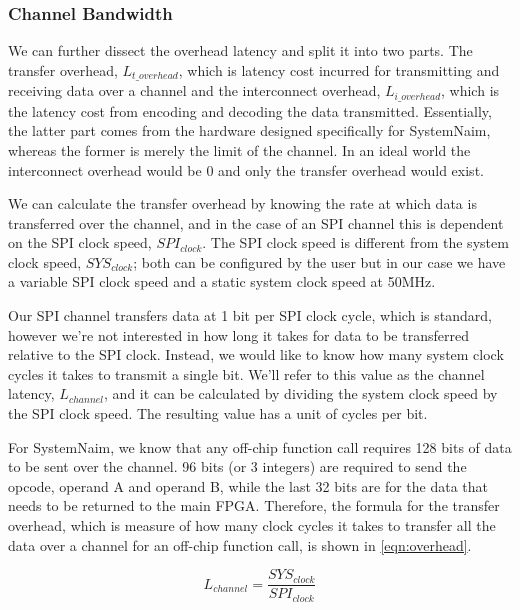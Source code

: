 \subsubsection{Channel Bandwidth}
 
We can further dissect the overhead latency and split it into two parts. The transfer overhead, $L_{t\_overhead}$, which is latency cost incurred for transmitting and receiving data over a channel and the interconnect overhead, $L_{i\_overhead}$, which is the latency cost from encoding and decoding the data transmitted. Essentially, the latter part comes from the hardware designed specifically for SystemNaim, whereas the former is merely the limit of the channel. In an ideal world the interconnect overhead would be 0 and only the transfer overhead would exist. 

We can calculate the transfer overhead by knowing the rate at which data is transferred over the channel, and in the case of an SPI channel this is dependent on the SPI clock speed, $\mathit{SPI}_{clock}$. The SPI clock speed is different from the system clock speed, $\mathit{SYS}_{clock}$; both can be configured by the user but in our case we have a variable SPI clock speed and a static system clock speed at 50MHz.

Our SPI channel transfers data at 1 bit per SPI clock cycle, which is standard, however we're not interested in how long it takes for data to be transferred relative to the SPI clock. Instead, we would like to know how many system clock cycles it takes to transmit a single bit. We'll refer to this value as the channel latency, $L_{channel}$, and it can be calculated by dividing the system clock speed by the SPI clock speed. The resulting value has a unit of cycles per bit.

For SystemNaim, we know that any off-chip function call requires 128 bits of data to be sent over the channel. 96 bits (or 3 integers) are required to send the opcode, operand A and operand B, while the last 32 bits are for the data that needs to be returned to the main FPGA. Therefore, the formula for the transfer overhead, which is measure of how many clock cycles it takes to transfer all the data over a channel for an off-chip function call, is shown in \autoref{eqn:overhead}. 

\begin{equation}
    L_{channel} = \frac{\mathit{SYS}_{clock}}{\mathit{SPI}_{clock}} 
    \label{eqn:clock_speed}
\end{equation}

